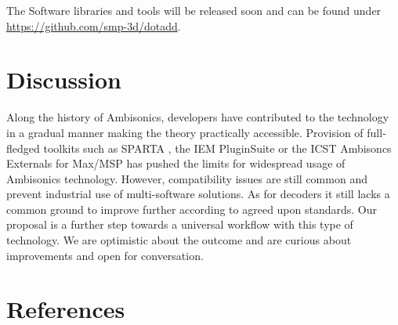 \documentclass[a4paper, 10pt, twocolumn]{article}
\begin{document}
The Software libraries and tools will be released soon and can be found under \href{https://github.com/smp-3d/dotadd}{https://github.com/smp-3d/dotadd}.

\section{Discussion}\label{sec:Discussion}

Along the history of Ambisonics, developers have contributed to the technology in a gradual manner making the theory practically accessible. Provision of full-fledged toolkits such as SPARTA \cite{SPARTAOnline}, the IEM PluginSuite \cite{IEMPluginsOnline} or the ICST Ambisoncs Externals for Max/MSP \cite{ICSTAmbiOnline} has pushed the limits for widespread usage of Ambisonics technology. However, compatibility issues are still common and prevent industrial use of multi-software solutions. 
As for decoders it still lacks a common ground to improve further according to agreed upon standards. Our proposal is a further step towards a universal workflow with this type of technology. We are optimistic about the outcome and are curious about improvements and open for conversation.



\renewcommand\refname{}
\section{References}\label{sec:References}

\begingroup
\RaggedRight 		%

\printbibliography
\endgroup
\end{document}
